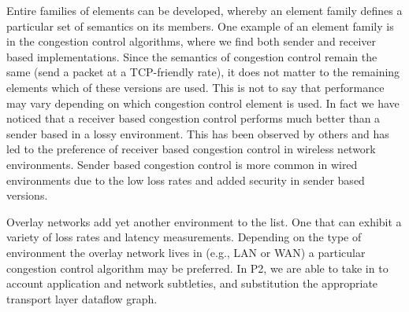Entire families of elements can be developed, whereby an element family defines
a particular set of semantics on its members. One example of an element family 
is in the congestion control algorithms, where we find both sender and receiver 
based implementations. Since the semantics of congestion control remain the 
same (send a packet at a TCP-friendly rate), it does not matter to the remaining 
elements which of these versions are used. 
This is not to say that performance may vary depending on which congestion control
element is used. In fact we have noticed that a receiver based congestion control
performs much better than a sender based in a lossy environment. This has been
observed by others and has led to the preference of receiver based congestion
control in wireless network environments. Sender based congestion control is more
common in wired environments due to the low loss rates and added security in 
sender based versions. 

Overlay networks add yet another environment to the list. One that can exhibit a
variety of loss rates and latency measurements. Depending on the type of environment 
the overlay network lives in (e.g., LAN or WAN) a particular congestion control algorithm 
may be preferred. In P2, we are able to take in to account application and network
subtleties, and substitution the appropriate transport layer dataflow graph.
 
